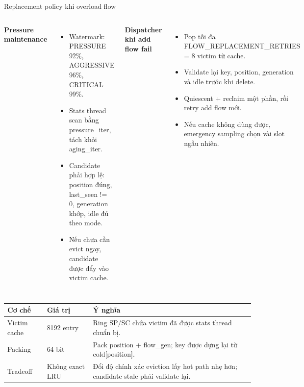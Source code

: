 \documentclass[aspectratio=169]{beamer}
\DeclareRobustCommand{\code}[1]{{\scriptsize\ttfamily #1}}
\begin{document}
\begin{frame}{Replacement policy khi overload flow}
\small
\begin{columns}[T]
\textbf{Pressure maintenance}
\begin{itemize}
    \item Watermark: \code{PRESSURE} 92\%, \code{AGGRESSIVE} 96\%, \code{CRITICAL} 99\%.
    \item Stats thread scan bằng \code{pressure\_iter}, tách khỏi \code{aging\_iter}.
    \item Candidate phải hợp lệ: position đúng, \code{last\_seen != 0}, generation khớp, idle đủ theo mode.
    \item Nếu chưa cần evict ngay, candidate được đẩy vào victim cache.
\end{itemize}

\textbf{Dispatcher khi add flow fail}
\begin{itemize}
    \item Pop tối đa \code{FLOW\_REPLACEMENT\_RETRIES = 8} victim từ cache.
    \item Validate lại key, position, generation và idle trước khi delete.
    \item Quiescent + reclaim một phần, rồi retry add flow mới.
    \item Nếu cache không dùng được, emergency sampling chọn vài slot ngẫu nhiên.
\end{itemize}
\end{columns}

\vspace{0.15cm}
\scriptsize
\begin{tabularx}{\textwidth}{|L{2.5cm}|L{2.1cm}|Y|}
\hline
\textbf{Cơ chế} & \textbf{Giá trị} & \textbf{Ý nghĩa} \\
\hline
Victim cache & 8192 entry & Ring SP/SC chứa victim đã được stats thread chuẩn bị. \\
\hline
Packing & 64 bit & Pack \code{position} + \code{flow\_gen}; key được dựng lại từ \code{cold[position]}. \\
\hline
Tradeoff & Không exact LRU & Đổi độ chính xác eviction lấy hot path nhẹ hơn; candidate stale phải validate lại. \\
\hline
\end{tabularx}
\end{frame}
\end{document}
